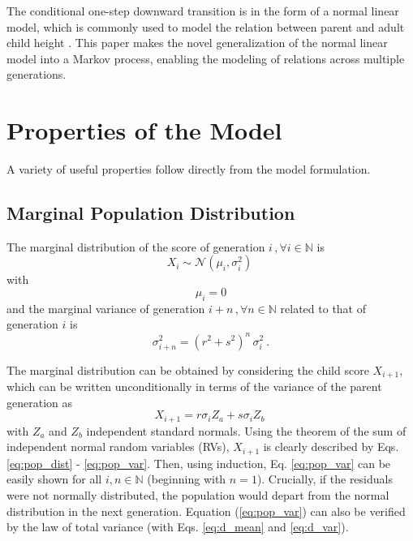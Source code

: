 \documentclass{svproc} %
\begin{document}
The conditional one-step downward transition is in the form of a normal linear model, which is commonly used to model the relation between parent and adult child height \cite{luo}. This paper makes the novel generalization of the normal linear model into a Markov process, enabling the modeling of relations across multiple generations. 


\section{Properties of the Model}

A variety of useful properties follow directly from the model formulation. 

\subsection{Marginal Population Distribution}
The marginal distribution of the score of generation $i \, , \forall i \in \mathbb{N}$ is
\begin{equation}
X_i \sim \mathcal{N}(\mu_i, \sigma_i^2) \ 
\label{eq:pop_dist}
\end{equation}
with
\begin{equation}
\mu_i = 0 
\label{eq:pop_mean}
\end{equation}
and the marginal variance of generation $i+n \, , \forall n \in \mathbb{N}$ related to that of generation $i$ is
\begin{equation}
\sigma_{i+n}^2 = (r^2+s^2)^n  \, \sigma_{i}^2 \ .
\label{eq:pop_var}
\end{equation}

The marginal distribution can be obtained by considering the child score $X_{i+1}$, which can be written unconditionally in terms of the variance of the parent generation as
\begin{equation}
X_{i+1} = r\sigma_iZ_a + s\sigma_iZ_b \ 
\label{eq:derive_pop_var}
\end{equation}
with $Z_a$ and $Z_b$ independent standard normals. Using the theorem of the sum of independent normal random variables (RVs),  $X_{i+1}$ is clearly described by Eqs. \ref{eq:pop_dist} - \ref{eq:pop_var}. Then, using induction, Eq. \ref{eq:pop_var} can be easily shown for all $i, n \in \mathbb{N}$ (beginning with $n = 1$). Crucially, if the residuals were not normally distributed, the population would depart from the normal distribution in the next generation. Equation (\ref{eq:pop_var}) can also be verified by the law of total variance (with Eqs. \ref{eq:d_mean} and \ref{eq:d_var}).
\end{document}
